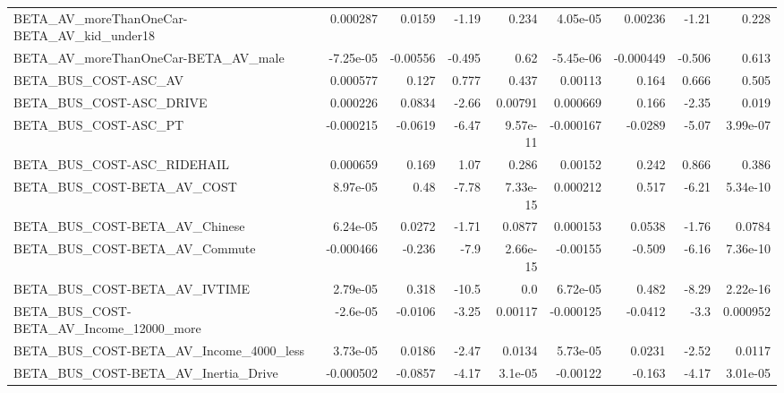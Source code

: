 \begin{tabular}{lrrrrrrrr}
BETA\_AV\_moreThanOneCar-BETA\_AV\_kid\_under18         &    0.000287 &       0.0159 &    -1.19 &    0.234 &   4.05e-05 &     0.00236 &        -1.21 &         0.228 \\
BETA\_AV\_moreThanOneCar-BETA\_AV\_male                &   -7.25e-05 &     -0.00556 &   -0.495 &     0.62 &  -5.45e-06 &   -0.000449 &       -0.506 &         0.613 \\
BETA\_BUS\_COST-ASC\_AV                               &    0.000577 &        0.127 &    0.777 &    0.437 &    0.00113 &       0.164 &        0.666 &         0.505 \\
BETA\_BUS\_COST-ASC\_DRIVE                            &    0.000226 &       0.0834 &    -2.66 &  0.00791 &   0.000669 &       0.166 &        -2.35 &         0.019 \\
BETA\_BUS\_COST-ASC\_PT                               &   -0.000215 &      -0.0619 &    -6.47 & 9.57e-11 &  -0.000167 &     -0.0289 &        -5.07 &      3.99e-07 \\
BETA\_BUS\_COST-ASC\_RIDEHAIL                         &    0.000659 &        0.169 &     1.07 &    0.286 &    0.00152 &       0.242 &        0.866 &         0.386 \\
BETA\_BUS\_COST-BETA\_AV\_COST                         &    8.97e-05 &         0.48 &    -7.78 & 7.33e-15 &   0.000212 &       0.517 &        -6.21 &      5.34e-10 \\
BETA\_BUS\_COST-BETA\_AV\_Chinese                      &    6.24e-05 &       0.0272 &    -1.71 &   0.0877 &   0.000153 &      0.0538 &        -1.76 &        0.0784 \\
BETA\_BUS\_COST-BETA\_AV\_Commute                      &   -0.000466 &       -0.236 &     -7.9 & 2.66e-15 &   -0.00155 &      -0.509 &        -6.16 &      7.36e-10 \\
BETA\_BUS\_COST-BETA\_AV\_IVTIME                       &    2.79e-05 &        0.318 &    -10.5 &      0.0 &   6.72e-05 &       0.482 &        -8.29 &      2.22e-16 \\
BETA\_BUS\_COST-BETA\_AV\_Income\_12000\_more            &    -2.6e-05 &      -0.0106 &    -3.25 &  0.00117 &  -0.000125 &     -0.0412 &         -3.3 &      0.000952 \\
BETA\_BUS\_COST-BETA\_AV\_Income\_4000\_less             &    3.73e-05 &       0.0186 &    -2.47 &   0.0134 &   5.73e-05 &      0.0231 &        -2.52 &        0.0117 \\
BETA\_BUS\_COST-BETA\_AV\_Inertia\_Drive                &   -0.000502 &      -0.0857 &    -4.17 &  3.1e-05 &   -0.00122 &      -0.163 &        -4.17 &      3.01e-05 \\

\end{tabular}
